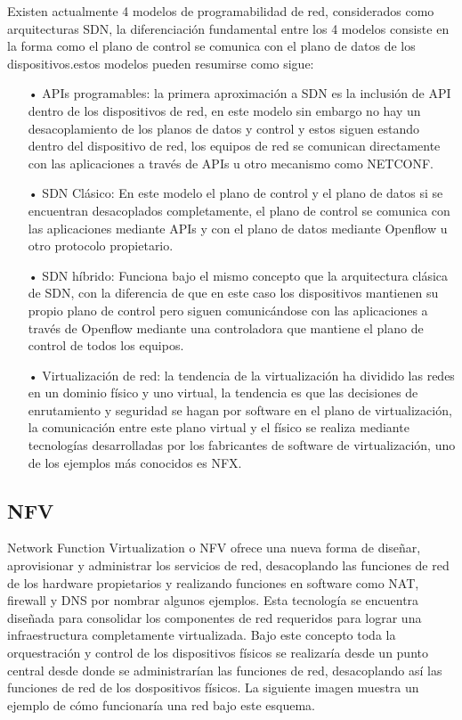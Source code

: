 Existen actualmente 4 modelos de programabilidad de red, considerados como arquitecturas SDN, la diferenciación fundamental entre los 4 modelos consiste en la forma como el plano de control se comunica con el plano de datos de los dispositivos.estos modelos pueden resumirse como sigue:
\begin{itemize}
\item[•]APIs programables: la primera aproximación a SDN es la inclusión de API dentro de los dispositivos de red, en este modelo sin embargo no hay un desacoplamiento de los planos de datos y control y estos siguen estando dentro del dispositivo de red, los equipos de red se comunican directamente con las aplicaciones a través de APIs u otro mecanismo como NETCONF.
\item[•]SDN Clásico: En este modelo el plano de control y el plano de datos si se encuentran desacoplados completamente, el plano de control se comunica con las aplicaciones mediante APIs y con el plano de datos mediante Openflow u otro protocolo propietario.
\item[•]SDN híbrido: Funciona bajo el mismo concepto que la arquitectura clásica de SDN, con la diferencia de que en este caso los dispositivos mantienen su propio plano de control pero siguen comunicándose con las aplicaciones a través de Openflow mediante una controladora que mantiene el plano de control de todos los equipos.
\item[•]Virtualización de red: la tendencia de la virtualización ha dividido las redes en un dominio físico y uno virtual, la tendencia es que las decisiones de enrutamiento y seguridad se hagan por software en el plano de virtualización, la comunicación entre este plano virtual y el físico se realiza mediante tecnologías desarrolladas por los fabricantes de software de virtualización, uno de los ejemplos más conocidos es NFX.


\end{itemize}
\subsection{NFV}
\label{sec:NFV}

Network Function Virtualization o NFV ofrece una nueva forma de diseñar, aprovisionar y administrar los servicios de red, desacoplando las funciones de red de los hardware propietarios y realizando funciones en software como NAT, firewall y DNS por nombrar algunos ejemplos. Esta tecnología se encuentra diseñada para consolidar los componentes de red requeridos para lograr una infraestructura completamente virtualizada.
Bajo este concepto toda la orquestración y control de los dispositivos físicos se realizaría desde un punto central desde donde se administrarían las funciones de red, desacoplando así las funciones de red de los dospositivos físicos. La siguiente imagen muestra un ejemplo de cómo funcionaría una red bajo este esquema.


